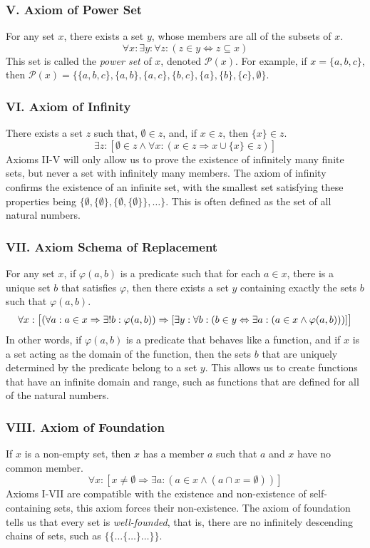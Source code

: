 \documentclass[11pt]{report}
\theoremstyle{definition}
\theoremstyle{theorem}
\theoremstyle{lemma}
\begin{document}
\subsubsection*{V. Axiom of Power Set}
For any set $x$, there exists a set $y$, whose members are all of the subsets of $x$.
$$\forall x: \exists y: \forall z: (z\in y \Leftrightarrow z \subseteq x)$$
This set is called the \emph{power set} of $x$, denoted $\mathcal{P}(x)$.
For example, if $x = \{a,b,c\}$, then $\mathcal{P}(x) = \{\{a,b,c\},\{a,b\},\{a,c\},\{b,c\}, \{a\}, \{b\}, \{c\}, \emptyset\}$.

\subsubsection*{VI. Axiom of Infinity}
There exists a set $z$ such that, $\emptyset \in z$, and, if $x\in z$, then $\{x\}\in z$.
$$\exists z: [\emptyset\in z \wedge \forall x: (x\in z \Rightarrow x \cup \{x\}\in z)]$$
Axioms II-V will only allow us to prove the existence of infinitely many finite sets, but never a set with infinitely many members. The axiom of infinity confirms the existence of an infinite set, with the smallest set satisfying these properties being $\{ \emptyset, \{\emptyset\}, \{\emptyset, \{\emptyset\}\},\ldots \}$. This is often defined as the set of all natural numbers.

\subsubsection*{VII. Axiom Schema of Replacement}
For any set $x$, if $\varphi(a,b)$ is a predicate such that for each $a\in x$, there is a unique set $b$ that satisfies $\varphi$, then there exists a set $y$ containing exactly the sets $b$ such that $\varphi(a,b)$.
$$\forall x: \big{[}(\forall a: a\in x \Rightarrow \exists! b: \varphi(a,b))
  \Rightarrow [\exists y: \forall b: (b \in y \Leftrightarrow \exists a: (a\in x \wedge \varphi(a,b)))]\big{]}$$
In other words, if $\varphi(a,b)$ is a predicate that behaves like a function, and if $x$ is a set acting as the domain of the function, then the sets $b$ that are uniquely determined by the predicate belong to a set $y$. This allows us to create functions that have an infinite domain and range, such as functions that are defined for all of the natural numbers.

\subsubsection*{VIII. Axiom of Foundation}
If $x$ is a non-empty set, then $x$ has a member $a$ such that $a$ and $x$ have no common member.
$$\forall x: [x \neq \emptyset \Rightarrow \exists a: (a\in x \wedge (a \cap x = \emptyset))]$$
Axioms I-VII are compatible with the existence and non-existence of self-containing sets, this axiom forces their non-existence. The axiom of foundation tells us that every set is \emph{well-founded}, that is, there are no infinitely descending chains of sets, such as $\{\{\ldots\{\ldots\}\ldots\}\}$.
\end{document}
